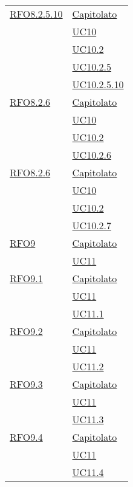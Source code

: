 \begin{longtable}{|>{\centering}m{5cm}|m{5cm}<{\centering}|}
 \hyperlink{RFO8.2.5.10}{RFO8.2.5.10} & \hyperlink{Capitolato}{Capitolato}\\
 & \hyperref[UC10]{UC10}\\
 & \hyperref[UC10.2]{UC10.2}\\
 & \hyperref[UC10.2.5]{UC10.2.5}\\
 & \hyperref[UC10.2.5.10]{UC10.2.5.10}\\\hline
 
 \hyperlink{RFO8.2.6}{RFO8.2.6} & \hyperlink{Capitolato}{Capitolato}\\
 & \hyperref[UC10]{UC10}\\
 & \hyperref[UC10.2]{UC10.2}\\
 & \hyperref[UC10.2.6]{UC10.2.6}\\\hline
 
 \hyperlink{RFO8.2.6}{RFO8.2.6} & \hyperlink{Capitolato}{Capitolato}\\
 & \hyperref[UC10]{UC10}\\
 & \hyperref[UC10.2]{UC10.2}\\
 & \hyperref[UC10.2.7]{UC10.2.7}\\\hline
 
  \hyperlink{RFO9}{RFO9} & \hyperlink{Capitolato}{Capitolato}\\
 & \hyperref[UC11]{UC11}\\\hline
 
   \hyperlink{RFO9.1}{RFO9.1} & \hyperlink{Capitolato}{Capitolato}\\
 & \hyperref[UC11]{UC11}\\
  & \hyperref[UC11.1]{UC11.1}\\\hline
  
    \hyperlink{RFO9.2}{RFO9.2} & \hyperlink{Capitolato}{Capitolato}\\
  & \hyperref[UC11]{UC11}\\
  & \hyperref[UC11.2]{UC11.2}\\\hline
  
     \hyperlink{RFO9.3}{RFO9.3} & \hyperlink{Capitolato}{Capitolato}\\
  & \hyperref[UC11]{UC11}\\
  & \hyperref[UC11.3]{UC11.3}\\\hline
  
      \hyperlink{RFO9.4}{RFO9.4} & \hyperlink{Capitolato}{Capitolato}\\
  & \hyperref[UC11]{UC11}\\
  & \hyperref[UC11.4]{UC11.4}\\\hline
  

\end{longtable}
